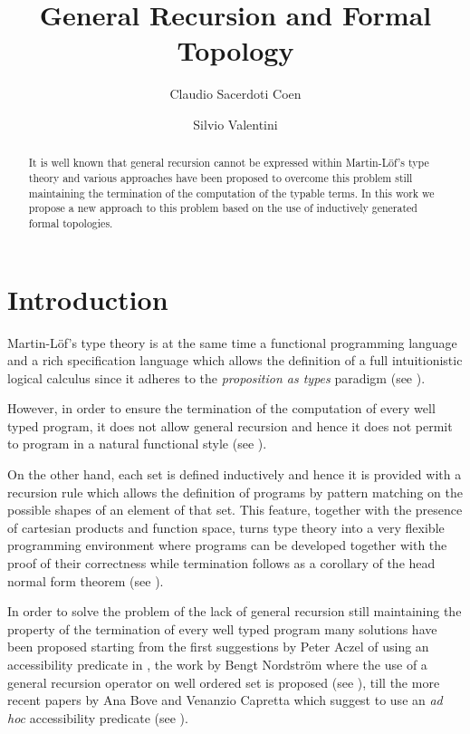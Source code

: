 \documentclass[copyright,creativecommons]{eptcs}
\title{General Recursion and Formal Topology}
\author{
Claudio Sacerdoti Coen
\institute{Dipartimento di Scienze dell'Informazione\\
Universisit\`a di Bologna}
\email{sacerdot@cs.unbo.it}
\and
Silvio Valentini
\institute{Dipartimento di Matematica Pura e Applicata\\
Universit\`a di Padova}
\email{silvio@math.unipd.it}
}
\begin{document}
\maketitle

\begin{abstract}
It is well known that general recursion cannot be expressed within Martin-L\"of's type 
theory and various approaches have been proposed to overcome this problem 
still maintaining the termination of the computation of the typable terms.
In this work we propose a new approach to this problem based on the use of
inductively generated formal topologies.
\end{abstract}



\section{Introduction}
\label{introduction}

Martin-L\"of's type theory is at the same time a functional programming language
and a rich specification language which allows the definition of a full intuitionistic logical
calculus since it adheres to the {\em proposition as types} paradigm (see \cite{ML84}).

However, in order to ensure the termination of the computation of every well typed program, 
it does not allow general recursion and hence it does not permit to program
in a natural functional style (see \cite{Hug84}).

On the other hand, each set is defined inductively and hence it is provided with 
a recursion rule which allows the definition of programs by pattern matching on the
possible shapes of an element of that set.
This feature, together with the presence of cartesian products and function space, turns 
type theory into a very flexible programming environment where programs can be 
developed together with the proof of their correctness while termination follows
as a corollary of the head normal form theorem (see \cite{BV92}).

In order to solve the problem of the lack of general recursion still maintaining the 
property of the termination of every well typed program many solutions have been
proposed starting from the first suggestions by Peter Aczel of using an accessibility 
predicate in \cite{Acz77}, the work by Bengt Nordstr\"om where the use of a 
general recursion operator on well ordered set is proposed (see \cite{Nor88}), 
till the more recent papers by Ana Bove and Venanzio Capretta
which suggest to use an {\em ad hoc} accessibility predicate (see \cite{BC05}).
\end{document}
